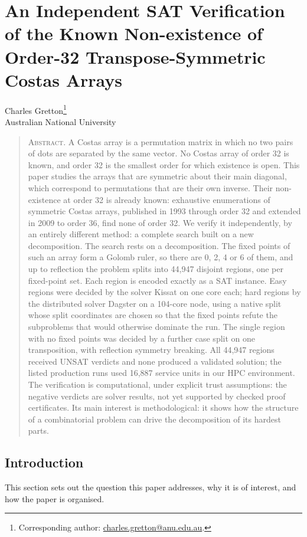 \documentclass[11pt,a4paper,oneside]{report}
\makeatletter
\theoremstyle{definition}
\newcommand{\paperauthor}{\begin{center}\large Charles Gretton\footnote{Corresponding author: \href{mailto:charles.gretton@anu.edu.au}{charles.gretton@anu.edu.au}.}\\[2pt]\normalsize Australian National University\end{center}\vspace{0.5em}}
\newcommand{\paperabstract}[1]{\begin{quote}\small\noindent\textsc{Abstract.} #1\end{quote}\vspace{0.5em}}
\makeatother
\begin{document}
\chapter{An Independent SAT Verification of the Known Non-existence of Order-32 Transpose-Symmetric Costas Arrays}\label{p8-paper}
\paperauthor
\paperabstract{A Costas array is a permutation matrix in which no two pairs of dots are separated by the
same vector. No Costas array of order 32 is known, and order 32 is the smallest order for
which existence is open. This paper studies the arrays that are symmetric about their main
diagonal, which correspond to permutations that are their own inverse. Their non-existence at
order 32 is already known: exhaustive enumerations of symmetric Costas arrays, published in
1993 through order 32 and extended in 2009 to order 36, find none of order 32. We verify it independently, by an entirely different method: a complete
search built on a new decomposition.
The search rests on a decomposition. The fixed points of such an array form a Golomb ruler,
so there are 0, 2, 4 or 6 of them, and up to reflection the problem splits into
44{,}947 disjoint regions, one per fixed-point set. Each region is encoded exactly
as a SAT instance. Easy regions were decided by the solver Kissat on one core each; hard
regions by the distributed solver Dagster on a 104-core node, using a native split
whose split coordinates are chosen so that the fixed points refute the subproblems that
would otherwise dominate the run. The single region with no fixed points was decided by a
further case split on one transposition, with reflection symmetry breaking. All 44{,}947
regions received UNSAT verdicts and none produced a validated solution; the listed production
runs used 16{,}887 service units in our HPC environment. The verification is computational, under explicit trust assumptions: the negative verdicts
are solver results, not yet supported by checked proof certificates. Its main interest is
methodological: it shows how the structure of a combinatorial problem can drive the
decomposition of its hardest parts.}


\section{Introduction}
This section sets out the question this paper addresses, why it is of interest, and how the paper is organised.

\end{document}
